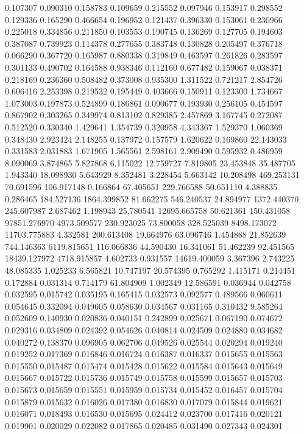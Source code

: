 0.107307
0.090310
0.158783
0.109659
0.215552
0.097946
0.153917
0.298552
0.129336
0.165290
0.466654
0.196952
0.121437
0.396330
0.153061
0.230966
0.225018
0.334856
0.211850
0.103553
0.190745
0.136269
0.127705
0.194603
0.387087
0.739923
0.114378
0.277655
0.383748
0.130828
0.205497
0.376718
0.066290
0.367720
0.165987
0.880338
0.319849
0.463597
0.261826
0.283597
0.301133
0.490702
0.164588
0.938346
0.112160
0.677482
0.159067
0.038371
0.218169
0.236360
0.508482
0.373008
0.935300
1.311522
0.721217
2.854726
0.606416
2.253398
0.219532
0.195449
0.403666
0.150911
0.123300
1.734667
1.073003
0.197873
0.524899
0.186861
0.090677
0.193930
0.256105
0.454597
0.867902
0.303265
0.349974
0.813102
0.829385
2.457869
3.167745
0.272087
0.512520
0.330340
1.429641
1.354739
0.320958
4.343367
1.529370
1.060369
0.348430
2.923424
2.148255
0.137972
0.157579
1.620622
0.169860
22.143033
0.331583
2.031883
1.671905
1.565561
2.598161
2.909490
0.595932
0.486959
8.090069
3.874865
5.827868
6.115022
12.759727
7.819805
23.453848
35.487705
1.943340
18.098930
5.643929
8.352481
3.228454
5.663142
10.208498
469.253131
70.691596
106.917148
0.166864
67.405651
229.766588
50.651110
4.388835
0.286465
184.527136
1864.399852
81.662275
546.240537
24.894977
1372.440370
245.607987
2.687462
1.198943
25.780541
12695.665758
50.621361
150.431058
97851.276970
4973.509577
230.923025
73.800058
328.525039
8498.173072
11703.775883
4.332581
200.613408
19.664976
63.096746
1.454888
21.852639
744.146363
6119.815651
116.066836
44.590430
16.341061
51.462239
92.451565
18439.127972
4718.915857
4.602733
0.931557
14619.400059
3.367396
2.743225
48.085335
1.025233
6.565821
10.747197
20.574395
0.765292
1.415171
0.214451
0.172884
0.031314
0.714179
61.804909
1.002349
12.586591
0.036944
0.042758
0.032595
0.015742
0.035195
0.165415
0.032573
0.092577
0.489566
0.060611
0.054645
0.332094
0.049605
0.058630
0.034567
0.031165
0.310432
9.585264
0.052609
0.140930
0.020836
0.040151
0.242899
0.025671
0.067190
0.074672
0.029316
0.034809
0.024392
0.054626
0.040814
0.024509
0.024880
0.034682
0.040272
0.138370
0.096905
0.062706
0.049526
0.025544
0.020294
0.019240
0.019252
0.017369
0.016846
0.016724
0.016387
0.016337
0.015655
0.015563
0.015550
0.015487
0.015474
0.015428
0.015622
0.015584
0.015643
0.015649
0.015667
0.015722
0.015736
0.015749
0.015758
0.015599
0.015657
0.015703
0.015673
0.015659
0.015551
0.015959
0.015734
0.015452
0.016457
0.015704
0.015879
0.015632
0.016026
0.017380
0.016830
0.017079
0.015844
0.019621
0.016071
0.018493
0.016530
0.015695
0.024412
0.023700
0.017416
0.020121
0.019901
0.020029
0.022082
0.017865
0.020485
0.031490
0.027343
0.024301
